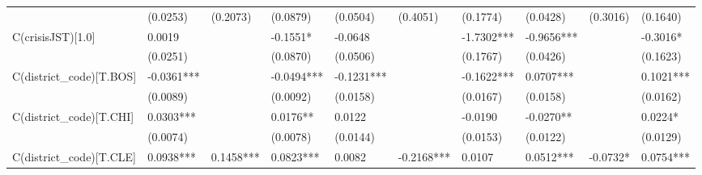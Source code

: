 \begin{table}
\begin{center}
\begin{tabular}{llllllllll}
                         & (0.0253)               & (0.2073)                & (0.0879)                 & (0.0504)                    & (0.4051)                     & (0.1774)                      & (0.0428)                   & (0.3016)                    & (0.1640)                      \\
C(crisisJST)[1.0]        & 0.0019                 &                         & -0.1551*                 & -0.0648                     &                              & -1.7302***                    & -0.9656***                 &                             & -0.3016*                      \\
                         & (0.0251)               &                         & (0.0870)                 & (0.0506)                    &                              & (0.1767)                      & (0.0426)                   &                             & (0.1623)                      \\
C(district\_code)[T.BOS] & -0.0361***             &                         & -0.0494***               & -0.1231***                  &                              & -0.1622***                    & 0.0707***                  &                             & 0.1021***                     \\
                         & (0.0089)               &                         & (0.0092)                 & (0.0158)                    &                              & (0.0167)                      & (0.0158)                   &                             & (0.0162)                      \\
C(district\_code)[T.CHI] & 0.0303***              &                         & 0.0176**                 & 0.0122                      &                              & -0.0190                       & -0.0270**                  &                             & 0.0224*                       \\
                         & (0.0074)               &                         & (0.0078)                 & (0.0144)                    &                              & (0.0153)                      & (0.0122)                   &                             & (0.0129)                      \\
C(district\_code)[T.CLE] & 0.0938***              & 0.1458***               & 0.0823***                & 0.0082                      & -0.2168***                   & 0.0107                        & 0.0512***                  & -0.0732*                    & 0.0754***                     \\

\end{tabular}
\end{center}
\end{table}
